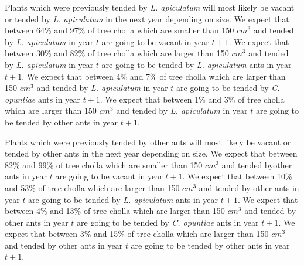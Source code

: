 \documentclass[11pt]{article}
\begin{document}
Plants which were previously tended by \textit{L. apiculatum} will most likely be vacant or tended by \textit{L. apiculatum} in the next year depending on size. 
We expect that between 64\% and 97\% of tree cholla which are smaller than 150 $cm^3$ and tended by \textit{L. apiculatum} in year $t$ are going to be vacant in year $t+1$.
We expect that between 30\% and 82\% of tree cholla which are larger than 150 $cm^3$ and tended by \textit{L. apiculatum} in year $t$ are going to be tended by \textit{L. apiculatum} ants in year $t+1$.
We expect that between 4\% and 7\% of tree cholla which are larger than 150 $cm^3$ and tended by \textit{L. apiculatum} in year $t$ are going to be tended by \textit{C. opuntiae} ants in year $t+1$.
We expect that between 1\% and 3\% of tree cholla which are larger than 150 $cm^3$ and tended by \textit{L. apiculatum} in year $t$ are going to be tended by other ants in year $t+1$.

Plants which were previously tended by other ants will most likely be vacant or tended by other ants in the next year depending on size. 
We expect that between 82\% and 99\% of tree cholla which are smaller than 150 $cm^3$ and tended byother ants in year $t$ are going to be vacant in year $t+1$.
We expect that between 10\% and 53\% of tree cholla which are larger than 150 $cm^3$ and tended by other ants in year $t$ are going to be tended by \textit{L. apiculatum} ants in year $t+1$.
We expect that between 4\% and 13\% of tree cholla which are larger than 150 $cm^3$ and tended by other ants in year $t$ are going to be tended by \textit{C. opuntiae} ants in year $t+1$.
We expect that between 3\% and 15\% of tree cholla which are larger than 150 $cm^3$ and tended by other ants in year $t$ are going to be tended by other ants in year $t+1$.
\end{document}
